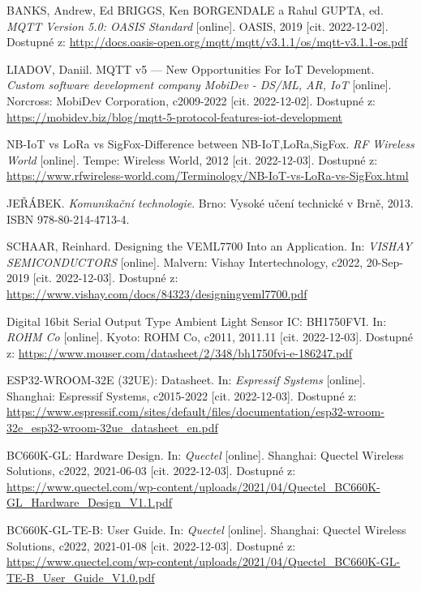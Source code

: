 \begin{thebibliography}{99}
BANKS, Andrew, Ed BRIGGS, Ken BORGENDALE a Rahul GUPTA, ed. \textit{MQTT Version 5.0: OASIS Standard} [online]. OASIS, 2019 [cit. 2022-12-02]. Dostupné z: \url{http://docs.oasis-open.org/mqtt/mqtt/v3.1.1/os/mqtt-v3.1.1-os.pdf}

LIADOV, Daniil. MQTT v5 --- New Opportunities For IoT Development. \textit{Custom software development company MobiDev - DS/ML, AR, IoT} [online]. Norcross: MobiDev Corporation, c2009-2022 [cit. 2022-12-02]. Dostupné z: \url{https://mobidev.biz/blog/mqtt-5-protocol-features-iot-development}

NB-IoT vs LoRa vs SigFox-Difference between NB-IoT,LoRa,SigFox. \textit{RF Wireless World} [online]. Tempe: Wireless World, 2012 [cit. 2022-12-03]. Dostupné z: \url{https://www.rfwireless-world.com/Terminology/NB-IoT-vs-LoRa-vs-SigFox.html}

JEŘÁBEK. \textit{Komunikační technologie}. Brno: Vysoké učení technické v Brně, 2013. ISBN 978-80-214-4713-4.

SCHAAR, Reinhard. Designing the VEML7700 Into an Application. In: \textit{VISHAY SEMICONDUCTORS} [online]. Malvern: Vishay Intertechnology, c2022, 20-Sep-2019 [cit. 2022-12-03]. Dostupné z: \url{https://www.vishay.com/docs/84323/designingveml7700.pdf}

Digital 16bit Serial Output Type Ambient Light Sensor IC: BH1750FVI. In: \textit{ROHM Co} [online]. Kyoto: ROHM Co, c2011, 2011.11 [cit. 2022-12-03]. Dostupné z: \url{https://www.mouser.com/datasheet/2/348/bh1750fvi-e-186247.pdf}

ESP32-­WROOM­-32E (32UE): Datasheet. In: \textit{Espressif Systems} [online]. Shanghai: Espressif Systems, c2015-2022 [cit. 2022-12-03]. Dostupné z: \url{https://www.espressif.com/sites/default/files/documentation/esp32-wroom-32e\_esp32-wroom-32ue\_datasheet\_en.pdf}

BC660K-GL: Hardware Design. In: \textit{Quectel} [online]. Shanghai: Quectel Wireless Solutions, c2022, 2021-06-03 [cit. 2022-12-03]. Dostupné z: \url{https://www.quectel.com/wp-content/uploads/2021/04/Quectel\_BC660K-GL\_Hardware\_Design\_V1.1.pdf}

BC660K-GL-TE-B: User Guide. In: \textit{Quectel} [online]. Shanghai: Quectel Wireless Solutions, c2022, 2021-01-08 [cit. 2022-12-03]. Dostupné z: \url{https://www.quectel.com/wp-content/uploads/2021/04/Quectel\_BC660K-GL-TE-B\_User\_Guide\_V1.0.pdf}


\end{thebibliography}
